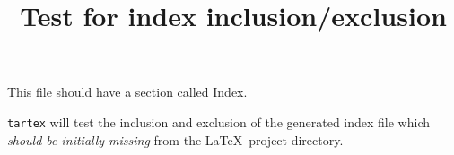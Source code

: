 \documentclass[11pt, a4paper]{article}
\title{Test for index inclusion/exclusion}
\begin{document}
This file should have a section called
Index.

\verb+tartex+ will test the inclusion and exclusion of the
generated index file which \emph{should be initially missing} from the \LaTeX\
project directory.

\printindex
\end{document}
